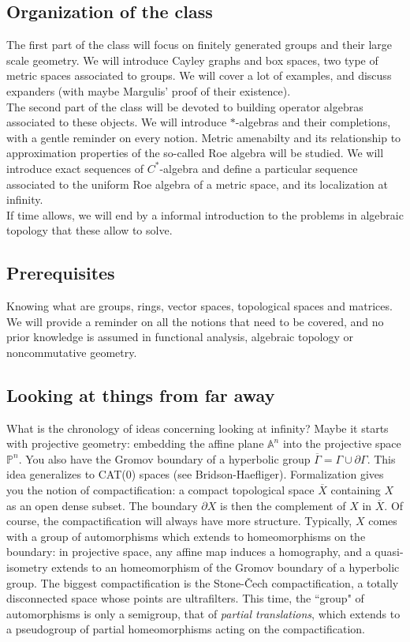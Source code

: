 \subsection*{Organization of the class}
The first part of the class will focus on finitely generated groups and their large scale geometry. We will introduce Cayley graphs and box spaces, two type of metric spaces associated to groups. We will cover a lot of examples, and discuss expanders (with maybe Margulis' proof of their existence).\\

The second part of the class will be devoted to building operator algebras associated to these objects. We will introduce $*$-algebras and their completions, with a gentle reminder on every notion. Metric amenabilty and its relationship to approximation properties of the so-called Roe algebra will be studied. We will introduce exact sequences of $C^*$-algebra and define a particular sequence associated to the uniform Roe algebra of a metric space, and its localization at infinity.\\

If time allows, we will end by a informal introduction to the problems in algebraic topology that these allow to solve.  

\subsection*{Prerequisites}

Knowing what are groups, rings, vector spaces, topological spaces and matrices. We will provide a reminder on all the notions that need to be covered, and no prior knowledge is assumed in functional analysis, algebraic topology or noncommutative geometry.

\subsection*{Looking at things from far away}

What is the chronology of ideas concerning looking at infinity? Maybe it starts with projective geometry: embedding the affine plane $\mathbb A^n$ into the projective space $\mathbb P^n$. You also have the Gromov boundary of a hyperbolic group $\overline \Gamma = \Gamma \cup \partial \Gamma$. This idea generalizes to CAT(0) spaces (see Bridson-Haefliger). Formalization gives you the notion of compactification: a compact topological space $\overline X$ containing $X$ as an open dense subset. The boundary $\partial X$ is then the complement of $X$ in $\overline X$. Of course, the compactification will always have more structure. Typically, $X$ comes with a group of automorphisms which extends to homeomorphisms on the boundary: in projective space, any affine map induces a homography, and a quasi-isometry extends to an homeomorphism of the Gromov boundary of a hyperbolic group. The biggest compactification is the Stone-\v{C}ech compactification, a totally disconnected space whose points are ultrafilters. This time, the ``group" of automorphisms is only a semigroup, that of \textit{partial translations}, which extends to a pseudogroup of partial homeomorphisms acting on the compactification.   
\newpage

